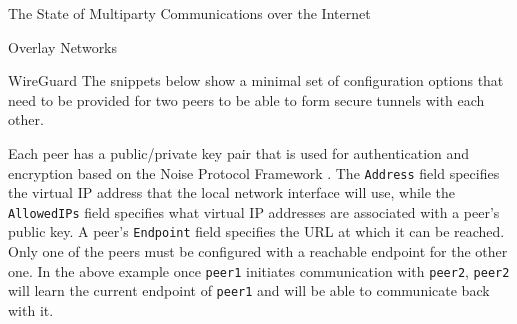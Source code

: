 \begin{frame}[fragile]{The State of Multiparty Communications over the
Internet}
\begin{block}{Overlay Networks}
\begin{block}{WireGuard}
The snippets below show a minimal set of configuration options that need
to be provided for two peers to be able to form secure tunnels with each
other.

\begin{Shaded}
\begin{Highlighting}[]
\KeywordTok{[Interface]}
\OtherTok{=}
\OtherTok{=}\StringTok{ }
\OtherTok{=}

\KeywordTok{[Peer]}
\OtherTok{=}
\OtherTok{=}
\OtherTok{=}
\end{Highlighting}
\end{Shaded}

\begin{Shaded}
\begin{Highlighting}[]
\KeywordTok{[Interface]}
\OtherTok{=}
\OtherTok{=}\StringTok{ }
\OtherTok{=}

\KeywordTok{[Peer]}
\OtherTok{=}
\OtherTok{=}
\end{Highlighting}
\end{Shaded}

Each peer has a public/private key pair that is used for authentication
and encryption based on the Noise Protocol Framework
\autocite{noiseDocs}. The \texttt{Address} field specifies the virtual
IP address that the local network interface will use, while the
\texttt{AllowedIPs} field specifies what virtual IP addresses are
associated with a peer's public key. A peer's \texttt{Endpoint} field
specifies the URL at which it can be reached. Only one of the peers must
be configured with a reachable endpoint for the other one. In the above
example once \texttt{peer1} initiates communication with \texttt{peer2},
\texttt{peer2} will learn the current endpoint of \texttt{peer1} and
will be able to communicate back with it.

\end{block}


\end{block}
\end{frame}
